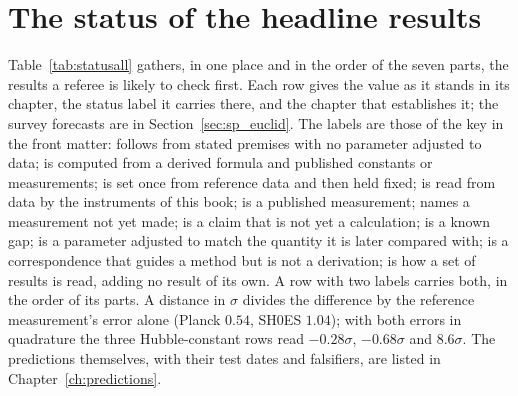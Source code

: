 \chapter{The status of the headline results}\label{ch:statusall}

Table~\ref{tab:statusall} gathers, in one place and in the order of the seven parts, the results a referee is likely to check first.
Each row gives the value as it stands in its chapter, the status label it carries there, and the chapter that establishes it; the survey forecasts are in Section~\ref{sec:sp_euclid}. The
labels are those of the key in the front matter: \derived{} follows from stated premises with no parameter adjusted to data;
\calc{} is computed from a derived formula and published constants or measurements; \calibrated{} is set once from reference data and
then held fixed; \measured{} is read from data by the instruments of this book; \observed{} is a published measurement; \prediction{}
names a measurement not yet made; \conjecture{} is a claim that is not yet a calculation; \openprob{} is a known gap; \fitted{} is a parameter adjusted to match the
quantity it is later compared with; \analogy{} is a correspondence that guides a method but is not a derivation; \interp{} is how a set of results
is read, adding no result of its own. A row with two
labels carries both, in the order of its parts. A distance in $\sigma$ divides the difference by the reference measurement's error alone
(Planck $0.54$, SH0ES $1.04$); with both errors in quadrature the three Hubble-constant rows read $-0.28\sigma$, $-0.68\sigma$ and $8.6\sigma$. \calc
The predictions themselves, with their test dates and falsifiers, are listed in Chapter~\ref{ch:predictions}.

